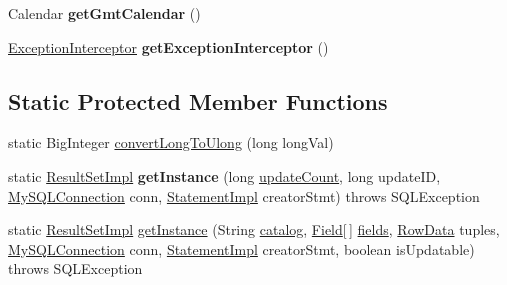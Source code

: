 \begin{DoxyCompactItemize}
\item 
\mbox{\label{classcom_1_1mysql_1_1jdbc_1_1_result_set_impl_ac771365cdff23a18d6a78936f5eb911c}} 
Calendar {\bfseries get\+Gmt\+Calendar} ()
\item 
\mbox{\label{classcom_1_1mysql_1_1jdbc_1_1_result_set_impl_a35228dcd8a82d56139ba20563e770d45}} 
\mbox{\hyperlink{interfacecom_1_1mysql_1_1jdbc_1_1_exception_interceptor}{Exception\+Interceptor}} {\bfseries get\+Exception\+Interceptor} ()
\end{DoxyCompactItemize}
\subsection*{Static Protected Member Functions}
\begin{DoxyCompactItemize}
\item 
static Big\+Integer \mbox{\hyperlink{classcom_1_1mysql_1_1jdbc_1_1_result_set_impl_a16e3f459e97906fb255efd74d2ee34c1}{convert\+Long\+To\+Ulong}} (long long\+Val)
\item 
\mbox{\label{classcom_1_1mysql_1_1jdbc_1_1_result_set_impl_a59ea5d2384babe754f16d1a5e737afc1}} 
static \mbox{\hyperlink{classcom_1_1mysql_1_1jdbc_1_1_result_set_impl}{Result\+Set\+Impl}} {\bfseries get\+Instance} (long \mbox{\hyperlink{classcom_1_1mysql_1_1jdbc_1_1_result_set_impl_a3278756f102c97b9e4f5e5aa53590722}{update\+Count}}, long update\+ID, \mbox{\hyperlink{interfacecom_1_1mysql_1_1jdbc_1_1_my_s_q_l_connection}{My\+S\+Q\+L\+Connection}} conn, \mbox{\hyperlink{classcom_1_1mysql_1_1jdbc_1_1_statement_impl}{Statement\+Impl}} creator\+Stmt)  throws S\+Q\+L\+Exception 
\item 
static \mbox{\hyperlink{classcom_1_1mysql_1_1jdbc_1_1_result_set_impl}{Result\+Set\+Impl}} \mbox{\hyperlink{classcom_1_1mysql_1_1jdbc_1_1_result_set_impl_a2b7230144634b4d3e651707a23fd5064}{get\+Instance}} (String \mbox{\hyperlink{classcom_1_1mysql_1_1jdbc_1_1_result_set_impl_ae05d8a0ad69c96645b783537100fb95c}{catalog}}, \mbox{\hyperlink{classcom_1_1mysql_1_1jdbc_1_1_field}{Field}}\mbox{[}$\,$\mbox{]} \mbox{\hyperlink{classcom_1_1mysql_1_1jdbc_1_1_result_set_impl_a5da5c6ef8d035aa65884115a2f7daf67}{fields}}, \mbox{\hyperlink{interfacecom_1_1mysql_1_1jdbc_1_1_row_data}{Row\+Data}} tuples, \mbox{\hyperlink{interfacecom_1_1mysql_1_1jdbc_1_1_my_s_q_l_connection}{My\+S\+Q\+L\+Connection}} conn, \mbox{\hyperlink{classcom_1_1mysql_1_1jdbc_1_1_statement_impl}{Statement\+Impl}} creator\+Stmt, boolean is\+Updatable)  throws S\+Q\+L\+Exception 
\end{DoxyCompactItemize}
